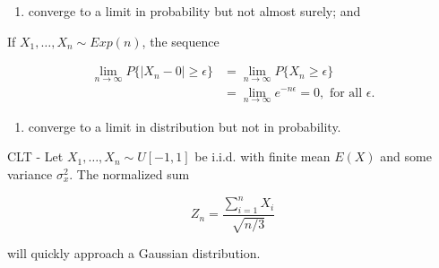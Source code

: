 \documentclass[]{article}
\newenvironment{Shaded}{\begin{snugshade}}{\end{snugshade}}
\newcommand{\DataTypeTok}[1]{\textcolor[rgb]{0.13,0.29,0.53}{#1}}
\newcommand{\DecValTok}[1]{\textcolor[rgb]{0.00,0.00,0.81}{#1}}
\newcommand{\FloatTok}[1]{\textcolor[rgb]{0.00,0.00,0.81}{#1}}
\newcommand{\KeywordTok}[1]{\textcolor[rgb]{0.13,0.29,0.53}{\textbf{#1}}}
\newcommand{\NormalTok}[1]{#1}
\newcommand{\OperatorTok}[1]{\textcolor[rgb]{0.81,0.36,0.00}{\textbf{#1}}}
\newcommand{\StringTok}[1]{\textcolor[rgb]{0.31,0.60,0.02}{#1}}
\providecommand{\tightlist}{%
  \setlength{\itemsep}{0pt}\setlength{\parskip}{0pt}}
\begin{document}
\begin{enumerate}
\def\labelenumi{(\alph{enumi})}
\setcounter{enumi}{1}
\tightlist
\item
  converge to a limit in probability but not almost surely; and
\end{enumerate}

If \(X_1,\dots,X_n \sim Exp(n)\), the sequence

\[
\begin{split}
\lim_{n \to \infty} P\{|X_n - 0| \geq \epsilon \} 
& = \lim_{n \to \infty} P\{X_n \geq \epsilon\} \\
& = \lim_{n \to \infty}  e^{-n \epsilon} = 0, \text{ for all } \epsilon.
\end{split}
\]

\begin{enumerate}
\def\labelenumi{(\alph{enumi})}
\setcounter{enumi}{2}
\tightlist
\item
  converge to a limit in distribution but not in probability.
\end{enumerate}

CLT - Let \(X_1,\dots,X_n \sim U[-1, 1]\) be i.i.d. with finite mean
\(E(X)\) and some variance \(\sigma_x^2\). The normalized sum

\[ Z_n = \frac{\sum_{i = 1}^{n}X_i}{\sqrt{n/3}}\]

will quickly approach a Gaussian distribution.

\begin{Shaded}
\end{Shaded}
\end{document}
